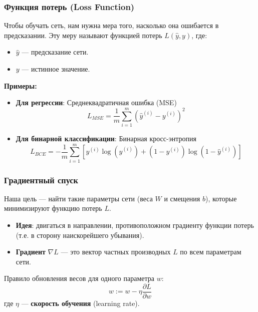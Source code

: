 \documentclass[notheorems, handout]{beamer}
\begin{document}
\begin{frame}
    \frametitle{Функция потерь (Loss Function)}
    Чтобы обучать сеть, нам нужна мера того, насколько она ошибается в предсказании. Эту меру называют функцией потерь $L(\hat{y}, y)$, где:
    \begin{itemize}
        \item $\hat{y}$ --- предсказание сети.
        \item $y$ --- истинное значение.
    \end{itemize}
    \pause
    \textbf{Примеры:}
    \begin{itemize}
        \item \textbf{Для регрессии}: Среднеквадратичная ошибка (MSE)
        \[L_{MSE} = \frac{1}{m} \sum_{i=1}^{m} (\hat{y}^{(i)} - y^{(i)})^2 \]
        
        \item \textbf{Для бинарной классификации}: Бинарная кросс-энтропия
        \[L_{BCE} = -\frac{1}{m} \sum_{i=1}^{m} [y^{(i)}\log(\hat{y}^{(i)}) + (1-y^{(i)})\log(1-\hat{y}^{(i)})] \]
    \end{itemize}
\end{frame}


\begin{frame}
    \frametitle{Градиентный спуск}
    Наша цель --- найти такие параметры сети (веса $W$ и смещения $b$), которые минимизируют функцию потерь $L$.
    \vfill
    \begin{itemize}
        \item \textbf{Идея}: двигаться в направлении, противоположном градиенту функции потерь (т.е. в сторону наискорейшего убывания).
        \item \textbf{Градиент} $\nabla L$ --- это вектор частных производных $L$ по всем параметрам сети.
    \end{itemize}
    \vfill
    \begin{block}
    \centering
    Правило обновления весов для одного параметра $w$:
    \[ w := w - \eta \frac{\partial L}{\partial w} \]
    где $\eta$ --- \textbf{скорость обучения} (learning rate).
    \end{block}
\end{frame}
\end{document}
